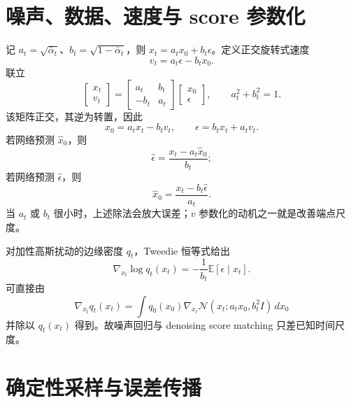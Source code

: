 \documentclass[11pt]{article}
\numberwithin{equation}{section}
\newcommand{\E}{\mathbb{E}}
\newcommand{\1}{\mathbf{1}}
\newcommand{\cN}{\mathcal{N}}
\begin{document}
\section{噪声、数据、速度与 score 参数化}

记 $a_t=\sqrt{\bar\alpha_t}$、$b_t=\sqrt{1-\bar\alpha_t}$，则
$x_t=a_tx_0+b_t\epsilon$。定义正交旋转式速度
\begin{equation}
 v_t=a_t\epsilon-b_tx_0.
\end{equation}
联立
\begin{equation}
 \begin{bmatrix}x_t\\v_t\end{bmatrix}
 =\begin{bmatrix}a_t&b_t\\-b_t&a_t\end{bmatrix}
 \begin{bmatrix}x_0\\\epsilon\end{bmatrix},
 \qquad a_t^2+b_t^2=1.
\end{equation}
该矩阵正交，其逆为转置，因此
\begin{equation}
 \boxed{x_0=a_tx_t-b_tv_t,\qquad
 \epsilon=b_tx_t+a_tv_t.}
\end{equation}
若网络预测 $\widehat x_0$，则
\begin{equation}
 \widehat\epsilon=\frac{x_t-a_t\widehat x_0}{b_t};
\end{equation}
若网络预测 $\widehat\epsilon$，则
\begin{equation}
 \widehat x_0=\frac{x_t-b_t\widehat\epsilon}{a_t}.
\end{equation}
当 $a_t$ 或 $b_t$ 很小时，上述除法会放大误差；$v$ 参数化的动机之一就是改善端点尺度。

对加性高斯扰动的边缘密度 $q_t$，Tweedie 恒等式给出
\begin{equation}
 \nabla_{x_t}\log q_t(x_t)
 =-\frac1{b_t}\E[\epsilon\mid x_t].
\end{equation}
可直接由
\begin{equation}
 \nabla_{x_t}q_t(x_t)
 =\int q_0(x_0)\nabla_{x_t}\cN(x_t;a_tx_0,b_t^2I)\,dx_0
\end{equation}
并除以 $q_t(x_t)$ 得到。故噪声回归与 denoising score matching 只差已知时间尺度。

\section{确定性采样与误差传播}
\end{document}
